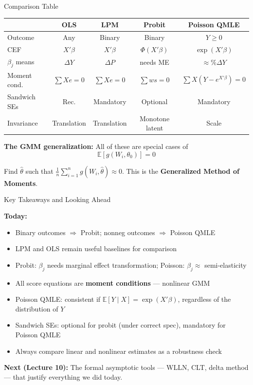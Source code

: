 \documentclass[aspectratio=169, handout, t]{beamer}
\numberwithin{equation}{section}
\begin{document}
\begin{frame}{Comparison Table}

\begin{center}
\renewcommand{\arraystretch}{1.25}
\small
\begin{tabular}{lcccc}
\toprule
& \textbf{OLS} & \textbf{LPM} & \textbf{Probit} & \textbf{Poisson QMLE} \\
\midrule
Outcome & Any & Binary & Binary & $Y \geq 0$ \\
CEF & $X'\beta$ & $X'\beta$ & $\Phi(X'\beta)$ & $\exp(X'\beta)$ \\
$\beta_j$ means & $\Delta Y$ & $\Delta P$ & needs ME & $\approx \%\Delta Y$ \\
Moment cond. & $\sum Xe = 0$ & $\sum Xe = 0$ & $\sum ws = 0$ & $\sum X(Y-e^{X'\beta})=0$ \\
Sandwich SEs & Rec. & Mandatory & Optional & \alert{Mandatory} \\
Invariance & Translation & Translation & Monotone latent & Scale \\
\bottomrule
\end{tabular}
\renewcommand{\arraystretch}{1.0}
\normalsize
\end{center}

\pause

\textbf{The GMM generalization:} All of these are special cases of
\[
\mathbb{E}[g(W_i, \theta_0)] = 0
\]

Find $\hat\theta$ such that $\frac{1}{n}\sum_{i=1}^n g(W_i, \hat\theta) \approx 0$. This is the \textbf{Generalized Method of Moments}.

\end{frame}


\begin{frame}{Key Takeaways and Looking Ahead}

\textbf{Today:}
\begin{itemize}
    \item Binary outcomes $\Rightarrow$ Probit; nonneg outcomes $\Rightarrow$ Poisson QMLE
    \item LPM and OLS remain useful baselines for comparison
    \item Probit: $\beta_j$ needs marginal effect transformation; Poisson: $\beta_j \approx$ semi-elasticity
    \item All score equations are \textbf{moment conditions} --- nonlinear GMM
    \item Poisson QMLE: consistent if $\mathbb{E}[Y \mid X] = \exp(X'\beta)$, regardless of the distribution of $Y$
    \item Sandwich SEs: optional for probit (under correct spec), \alert{mandatory} for Poisson QMLE
    \item Always compare linear and nonlinear estimates as a robustness check
\end{itemize}

\pause

\bigskip

\textbf{Next (Lecture 10):} The formal asymptotic tools --- WLLN, CLT, delta method --- that justify everything we did today.

\end{frame}
\end{document}
